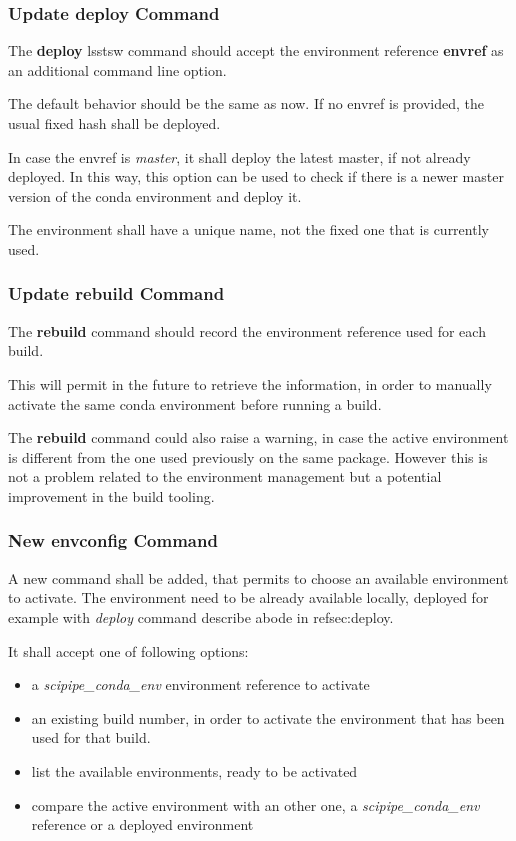 \subsubsection{Update deploy Command} \label{sec:deploy}

The \textbf{deploy} lsstsw command should accept the environment reference \textbf{envref}  as an additional command line option.

The default behavior should be the same as now. If no envref is provided, the usual fixed hash shall be deployed. 

In case the envref is \textit{master}, it shall deploy the latest master, if not already deployed.
In this way, this option can be used to check if there is a newer master version of the conda environment and deploy it.

The environment shall have a unique name, not the fixed one that is currently used.


\subsubsection{Update rebuild Command} \label{sec:rebuild}

The \textbf{rebuild} command should record the environment reference used for each build.

This will permit in the future to retrieve the information, in order to manually activate the same conda environment before running a build.

The \textbf{rebuild} command could also raise a warning, in case the active environment is different from the one used previously on the same package.
However this is not a problem related to the environment management but a potential improvement in the build tooling.


\subsubsection{New envconfig Command} \label{sec:envconfig}

A new command shall be added, that permits to choose an available environment to activate.
The environment need to be already available locally, deployed for example with \textit{deploy} command describe abode in ref{sec:deploy}.

It shall accept one of following options:

\begin{itemize}
\item a \textit{scipipe\_conda\_env} environment reference to activate
\item an existing build number, in order to activate the environment that has been used for that build.
\item list the available environments, ready to be activated
\item compare the active environment with an other one, a \textit{scipipe\_conda\_env} reference or a deployed environment
\end{itemize}

